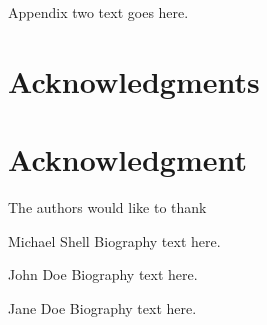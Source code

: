 \documentclass[10pt,journal,compsoc]{IEEEtran}
\begin{document}
\section{}
Appendix two text goes here.


\ifCLASSOPTIONcompsoc
  \section*{Acknowledgments}
\else
  \section*{Acknowledgment}
\fi


The authors would like to thank


\ifCLASSOPTIONcaptionsoff
  \newpage
\fi



\begin{IEEEbiography}{Michael Shell}
Biography text here.
\end{IEEEbiography}

\begin{IEEEbiographynophoto}{John Doe}
Biography text here.
\end{IEEEbiographynophoto}

\begin{IEEEbiographynophoto}{Jane Doe}
Biography text here.
\end{IEEEbiographynophoto}
\end{document}

